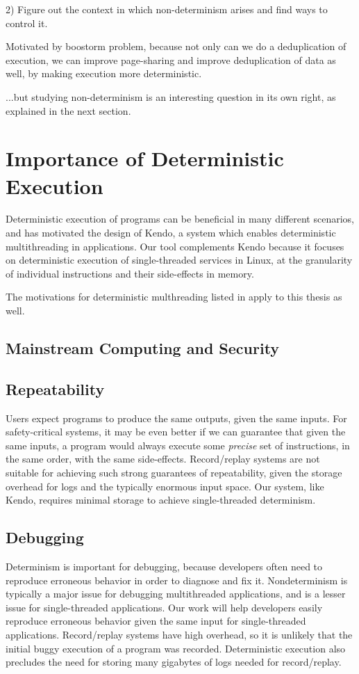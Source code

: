 2) Figure out the context in which non-determinism
arises and find ways to control it.

Motivated by boostorm problem, because not only can we
do a deduplication of execution, we can improve
page-sharing and improve deduplication of data as well,
by making execution more deterministic.

...but studying non-determinism is an interesting question in its
own right, as explained in the next section.

\section{Importance of Deterministic Execution}\label{ch1:whydeterminism}

Deterministic execution of programs can be beneficial in many
different scenarios, and has motivated the design of Kendo,
a system which enables deterministic multithreading
in applications\cite{}. Our tool complements Kendo because 
it focuses on deterministic execution of single-threaded services in Linux,
at the granularity of individual instructions and their side-effects in
memory.

The motivations for deterministic multhreading listed in
\cite{} apply to this thesis as well.

\subsection{Mainstream Computing and Security}


\subsection{Repeatability}
Users expect programs to produce the same outputs, given the same
inputs. For safety-critical systems, it may
be even better if we can guarantee that given the same inputs,
a program would always execute some {\em precise} 
set of instructions, in the same order, with
the same side-effects. Record/replay systems are not suitable for 
achieving such strong guarantees of repeatability, given the storage
overhead for logs and the typically enormous input space. 
Our system, like Kendo, requires minimal storage to achieve
single-threaded determinism. 

\subsection{Debugging}
Determinism is important for debugging, because developers
often need to reproduce erroneous behavior in
order to diagnose and fix it. Nondeterminism is typically
a major issue for debugging multithreaded applications,
and is a lesser issue for single-threaded
applications. Our work will help developers
easily reproduce erroneous behavior given
the same input for single-threaded applications. 
Record/replay systems have high overhead, so it is unlikely
that the initial buggy execution of a program was recorded.
Deterministic execution also precludes the need for storing
many gigabytes of logs needed for record/replay.

